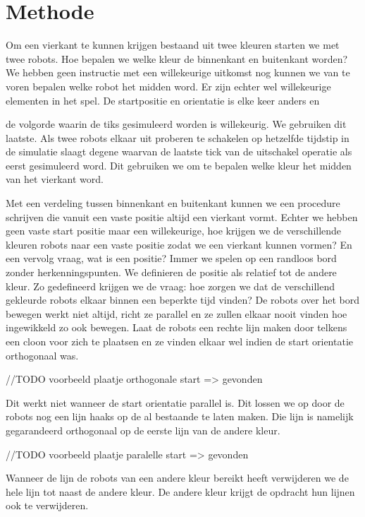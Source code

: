 \documentclass[10pt]{article}
\begin{document}
\section{Methode}

Om een vierkant te kunnen krijgen bestaand uit twee kleuren starten we met twee robots. Hoe bepalen we welke kleur de binnenkant en buitenkant worden? We hebben geen instructie met een willekeurige uitkomst nog kunnen we van te voren bepalen welke robot het midden word. Er zijn echter wel willekeurige elementen in het spel. De startpositie en orientatie is elke keer anders en

 de volgorde waarin de tiks gesimuleerd worden is willekeurig. We gebruiken dit laatste. Als twee robots elkaar uit proberen te schakelen op hetzelfde tijdstip in de simulatie slaagt degene waarvan de laatste tick van de uitschakel operatie als eerst gesimuleerd word. Dit gebruiken we om te bepalen welke kleur het midden van het vierkant word.

\label{lijnen}
Met een verdeling tussen binnenkant en buitenkant kunnen we een procedure schrijven die vanuit een vaste positie altijd een vierkant vormt. Echter we hebben geen vaste start positie maar een willekeurige, hoe krijgen we de verschillende kleuren robots naar een vaste positie zodat we een vierkant kunnen vormen? En een vervolg vraag, wat is een positie? Immer we spelen op een randloos bord zonder herkenningspunten. We definieren de positie als relatief tot de andere kleur. Zo gedefineerd krijgen we de vraag: hoe zorgen we dat de verschillend gekleurde robots elkaar binnen een beperkte tijd vinden? De robots over het bord bewegen werkt niet altijd, richt ze parallel en ze zullen elkaar nooit vinden hoe ingewikkeld zo ook bewegen. Laat de robots een rechte lijn maken door telkens een cloon voor zich te plaatsen en ze vinden elkaar wel indien de start orientatie orthogonaal was.

//TODO voorbeeld plaatje orthogonale start => gevonden

Dit werkt niet wanneer de start orientatie parallel is. Dit lossen we op door de robots nog een lijn haaks op de al bestaande te laten maken. Die lijn is namelijk gegarandeerd orthogonaal op de eerste lijn van de andere kleur. 

//TODO voorbeeld plaatje paralelle start => gevonden

Wanneer de lijn de robots van een andere kleur bereikt heeft verwijderen we de hele lijn tot naast de andere kleur. De andere kleur krijgt de opdracht hun lijnen ook te verwijderen.
\end{document}
